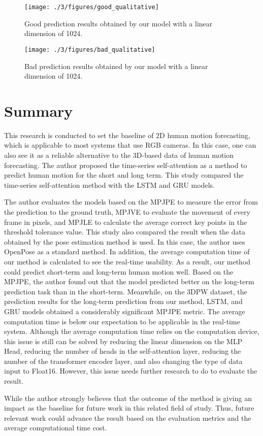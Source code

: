 \begin{figure}
    \centering
    \texttt{[image: ./3/figures/good\_qualitative]}
    \caption{Good prediction results obtained by our model with a linear dimension of 1024.}
    \label{fig:2D_good_qual}
\end{figure}
\begin{figure}
    \centering
    \texttt{[image: ./3/figures/bad\_qualitative]}
    \caption{Bad prediction results obtained by our model with a linear dimension of 1024.}
    \label{fig:2D_bad_qual}
\end{figure}

\section{Summary}
This research is conducted to set the baseline of 2D human motion forecasting, which is applicable to most systems that use RGB cameras. In this case, one can also see it as a reliable alternative to the 3D-based data of human motion forecasting. The author proposed the time-series self-attention as a method to predict human motion for the short and long term. This study compared the time-series self-attention method with the LSTM and GRU models. 

The author evaluates the models based on the MPJPE to measure the error from the prediction to the ground truth, MPJVE to evaluate the movement of every frame in pixels, and MPJLE to calculate the average correct key points in the threshold tolerance value. This study also compared the result when the data obtained by the pose estimation method is used. In this case, the author uses OpenPose as a standard method. In addition, the average computation time of our method is calculated to see the real-time usability. 
As a result, our method could predict short-term and long-term human motion well. Based on the MPJPE, the author found out that the model predicted better on the long-term prediction task than in the short-term. Meanwhile, on the 3DPW dataset, the prediction results for the long-term prediction from our method, LSTM, and GRU models obtained a considerably significant MPJPE metric. The average computation time is below our expectation to be applicable in the real-time system. Although the average computation time relies on the computation device, this issue is still can be solved by reducing the linear dimension on the MLP Head, reducing the number of heads in the self-attention layer, reducing the number of the transformer encoder layer, and also changing the type of data input to Float16. However, this issue needs further research to do to evaluate the result.

While the author strongly believes that the outcome of the method is giving an impact as the baseline for future work in this related field of study. Thus, future relevant work could advance the result based on the evaluation metrics and the average computational time cost.

